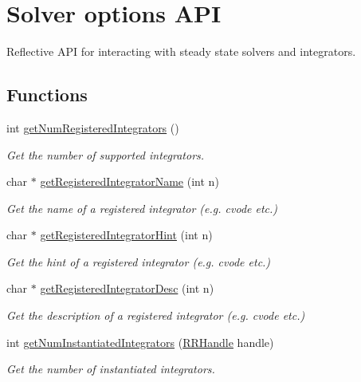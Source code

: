 \hypertarget{group__simopts}{\section{Solver options A\+P\+I}
\label{group__simopts}
}


Reflective A\+P\+I for interacting with steady state solvers and integrators.  


\subsection*{Functions}
\begin{DoxyCompactItemize}
\item 
int \hyperlink{group__simopts_ga53617fbabff8088e10c8bc5deee40353}{get\+Num\+Registered\+Integrators} ()
\begin{DoxyCompactList}\small\item\em Get the number of supported integrators. \end{DoxyCompactList}\item 
char $\ast$ \hyperlink{group__simopts_ga5713f7cea279fc58aa497615ebb7ddbf}{get\+Registered\+Integrator\+Name} (int n)
\begin{DoxyCompactList}\small\item\em Get the name of a registered integrator (e.\+g. cvode etc.) \end{DoxyCompactList}\item 
char $\ast$ \hyperlink{group__simopts_ga6d22f11e49e89336e5d795e620e55530}{get\+Registered\+Integrator\+Hint} (int n)
\begin{DoxyCompactList}\small\item\em Get the hint of a registered integrator (e.\+g. cvode etc.) \end{DoxyCompactList}\item 
char $\ast$ \hyperlink{group__simopts_gaae54354d9935875691727e0b89e5ebc2}{get\+Registered\+Integrator\+Desc} (int n)
\begin{DoxyCompactList}\small\item\em Get the description of a registered integrator (e.\+g. cvode etc.) \end{DoxyCompactList}\item 
int \hyperlink{group__simopts_ga492555873a0da5f8aa167eeafb7d7d21}{get\+Num\+Instantiated\+Integrators} (\hyperlink{rrc__types_8h_a1d68f0592372208fa5a5f2799ea4b3ae}{R\+R\+Handle} handle)
\begin{DoxyCompactList}\small\item\em Get the number of instantiated integrators. \end{DoxyCompactList}\item 

\end{DoxyCompactItemize}
